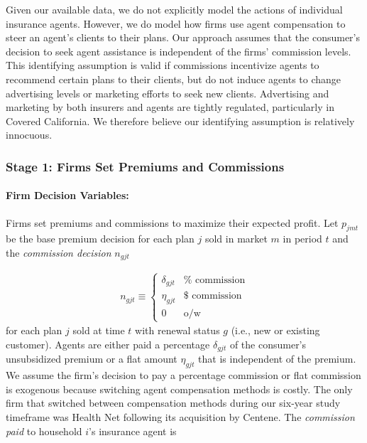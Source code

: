 \documentclass[12pt]{article}
\begin{document}
Given our available data, we do not explicitly model the actions of individual insurance agents.  However, we do model how firms use agent compensation to steer an agent's clients to their plans.  Our approach assumes that the consumer's decision to seek agent assistance is independent of the firms' commission levels.  This identifying assumption is valid if commissions incentivize agents to recommend certain plans to their clients, but do not induce agents to change advertising levels or marketing efforts to  seek new clients. Advertising and marketing by both insurers and agents are tightly regulated, particularly in Covered California.  We therefore believe our identifying assumption is relatively  innocuous.   

\subsubsection{Stage 1: Firms Set Premiums and Commissions}

\paragraph{Firm Decision Variables:}
Firms set premiums and commissions to maximize their expected profit.  Let $p_{jmt}$ be the base premium decision for each plan $j$ sold in market $m$ in period $t$ and the \textit{commission decision} $n_{gjt}$ 

\vspace{-0.4in}		
\singlespacing
\begin{eqnarray*}
    n_{gjt}  \equiv 
    \begin{cases} 
	    \delta_{gjt} & \mathrm{\% \,\, commission} \\		
	    \eta_{gjt} & \mathrm{\$ \,\, commission} \\
	    0 & \mathrm{o/w}
    \end{cases}
\end{eqnarray*}		   
\doublespacing
\noindent for each plan $j$ sold at time $t$ with renewal status $g$ (i.e., new or existing customer). Agents are either paid a percentage $\delta_{gjt}$  of the consumer's unsubsidized premium  or a flat amount $\eta_{gjt}$ that is independent of the premium.  We assume the firm's decision to pay a percentage commission or flat commission is exogenous because switching agent compensation methods is costly.  The only firm that switched between compensation methods during our six-year study timeframe was Health Net following its acquisition by Centene. The \textit{commission paid} to household $i$'s insurance agent is
\end{document}
